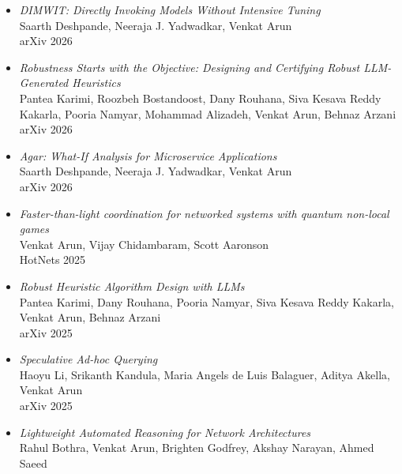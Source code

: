 \documentclass[notitlepage]{article}
\begin{document}
\begin{itemize}[noitemsep,nolistsep]
      Sanjoli Narang, Anup Agarwal, Venkat Arun, Manya Ghobadi\\
      arXiv 2026\\
              \item {\it DIMWIT: Directly Invoking Models Without Intensive Tuning}\label{paper:dimwit}\\
      Saarth Deshpande, Neeraja J. Yadwadkar, Venkat Arun\\
      arXiv 2026\\
              \item {\it Robustness Starts with the Objective: Designing and Certifying Robust LLM-Generated Heuristics}\label{paper:tailor}\\
      Pantea Karimi, Roozbeh Bostandoost, Dany Rouhana, Siva Kesava Reddy Kakarla, Pooria Namyar, Mohammad Alizadeh, Venkat Arun, Behnaz Arzani\\
      arXiv 2026\\
              \item {\it Agar: What-If Analysis for Microservice Applications}\label{paper:agar}\\
      Saarth Deshpande, Neeraja J. Yadwadkar, Venkat Arun\\
      arXiv 2026\\
              \item {\it Faster-than-light coordination for networked systems with quantum non-local games}\label{paper:nonlocal}\\
      Venkat Arun, Vijay Chidambaram, Scott Aaronson\\
      HotNets 2025\\
              \item {\it Robust Heuristic Algorithm Design with LLMs}\label{paper:robusta}\\
      Pantea Karimi, Dany Rouhana, Pooria Namyar, Siva Kesava Reddy Kakarla, Venkat Arun, Behnaz Arzani\\
      arXiv 2025\\
              \item {\it Speculative Ad-hoc Querying}\label{paper:speql}\\
      Haoyu Li, Srikanth Kandula, Maria Angels de Luis Balaguer, Aditya Akella, Venkat Arun\\
      arXiv 2025\\
              \item {\it Lightweight Automated Reasoning for Network Architectures}\label{paper:archie}\\
      Rahul Bothra, Venkat Arun, Brighten Godfrey, Akshay Narayan, Ahmed Saeed\\

\end{itemize}
\end{document}
